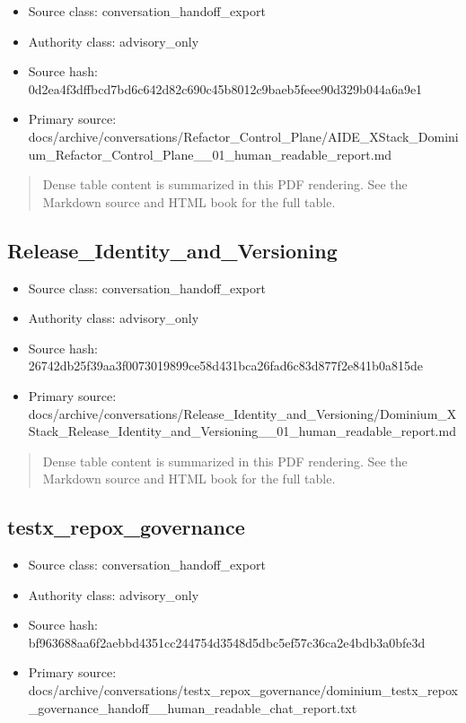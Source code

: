 \documentclass[11pt,a4paper]{report}
\begin{document}
\begin{itemize}
\item Source class: conversation\_handoff\_export
\item Authority class: advisory\_only
\item Source hash: 0d2ea4f3dffbcd7bd6c642d82c690c45b8012c9baeb5feee90d329b044a6a9e1
\item Primary source: docs/archive/conversations/Refactor\_Control\_Plane/AIDE\_XStack\_Dominium\_Refactor\_Control\_Plane\_\_01\_human\_readable\_report.md
\end{itemize}

\begin{quote}\small Dense table content is summarized in this PDF rendering. See the Markdown source and HTML book for the full table.\end{quote}

\subsection{Release\_Identity\_and\_Versioning}

\begin{itemize}
\item Source class: conversation\_handoff\_export
\item Authority class: advisory\_only
\item Source hash: 26742db25f39aa3f0073019899ce58d431bca26fad6c83d877f2e841b0a815de
\item Primary source: docs/archive/conversations/Release\_Identity\_and\_Versioning/Dominium\_XStack\_Release\_Identity\_and\_Versioning\_\_01\_human\_readable\_report.md
\end{itemize}

\begin{quote}\small Dense table content is summarized in this PDF rendering. See the Markdown source and HTML book for the full table.\end{quote}

\subsection{testx\_repox\_governance}

\begin{itemize}
\item Source class: conversation\_handoff\_export
\item Authority class: advisory\_only
\item Source hash: bf963688aa6f2aebbd4351cc244754d3548d5dbc5ef57c36ca2e4bdb3a0bfe3d
\item Primary source: docs/archive/conversations/testx\_repox\_governance/dominium\_testx\_repox\_governance\_handoff\_\_human\_readable\_chat\_report.txt
\end{itemize}
\end{document}
